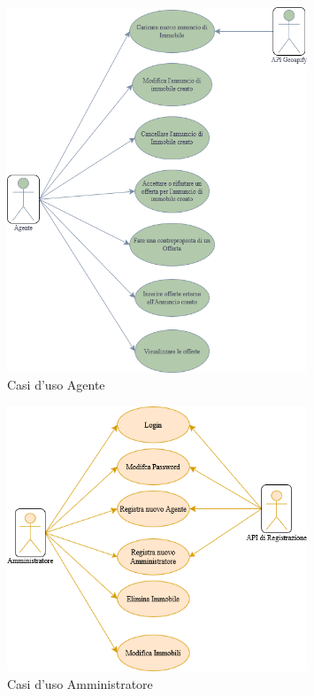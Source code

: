\begin{figure}[H]
\centering
\caption{Casi d'uso Agente}
\includegraphics[width=0.8\textwidth]{Immagini/Diagrammi Casi D'uso/UseCase-Agente.drawio.png}
\end{figure}

\begin{figure}[H]
\centering
\caption{Casi d'uso Amministratore}
\includegraphics[width=0.8\textwidth]{Immagini/Diagrammi Casi D'uso/UseCase-Admin.drawio.png}
\end{figure}
\newpage
